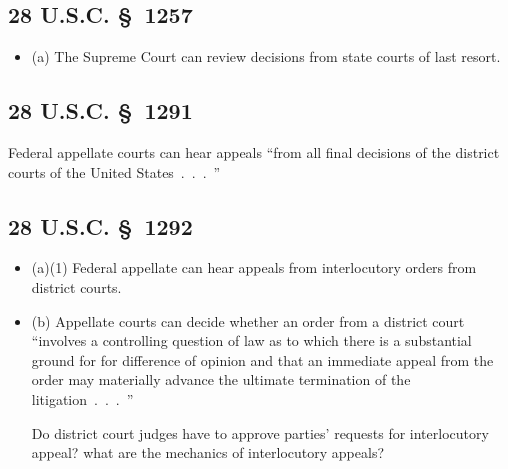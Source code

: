 \subsection{28 U.S.C. \S\ 1257}

\begin{itemize}
    \item (a) The Supreme Court can review decisions from state courts of last 
    resort.
\end{itemize}

\subsection{28 U.S.C. \S\ 1291}

Federal appellate courts can hear appeals ``from all final decisions of the 
district courts of the United States~.~.~.~''

\subsection{28 U.S.C. \S\ 1292}

\begin{itemize}
    \item (a)(1) Federal appellate can hear appeals from interlocutory orders 
    from district courts.
    \item (b) Appellate courts can decide whether an order from a district 
    court ``involves a controlling question of law as to which there is a 
    substantial ground for for difference of opinion and that an immediate 
    appeal from the order may materially advance the ultimate termination of 
    the litigation~.~.~.~''
    \item [Do district court judges have to approve parties' requests for 
    interlocutory appeal? what are the mechanics of interlocutory appeals?]
\end{itemize}
